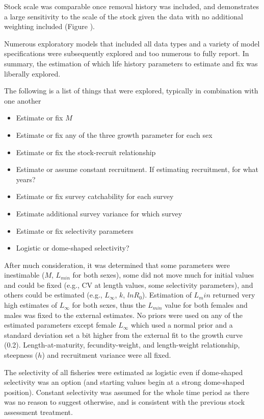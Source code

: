 \documentclass[
]{scrartcl}
\providecommand{\tightlist}{%
  \setlength{\itemsep}{0pt}\setlength{\parskip}{0pt}}\usepackage{longtable,booktabs,array}
\begin{document}
Stock scale was comparable once removal history was included, and
demonstrates a large sensitivity to the scale of the stock given the
data with no additional weighting included (Figure ).

Numerous exploratory models that included all data types and a variety
of model specifications were subsequently explored and too numerous to
fully report. In summary, the estimation of which life history
parameters to estimate and fix was liberally explored.

The following is a list of things that were explored, typically in
combination with one another

\begin{itemize}
\tightlist
\item
  Estimate or fix \(M\)
\item
  Estimate or fix any of the three growth parameter for each sex
\item
  Estimate or fix the stock-recruit relationship
\item
  Estimate or assume constant recruitment. If estimating recruitment,
  for what years?
\item
  Estimate or fix survey catchability for each survey
\item
  Estimate additional survey variance for which survey
\item
  Estimate or fix selectivity parameters
\item
  Logistic or dome-shaped selectivity?
\end{itemize}

After much consideration, it was determined that some parameters were
inestimable (\(M\), \(L_{min}\) for both sexes), some did not move much
for initial values and could be fixed (e.g., CV at length values, some
selectivity parameters), and others could be estimated (e.g.,
\(L_{\infty}\), \(k\), \(lnR_0\)). Estimation of \(L_min\) returned very
high estimates of \(L_{\infty}\) for both sexes, thus the \(L_{min}\)
value for both females and males was fixed to the external estimates. No
priors were used on any of the estimated parameters except female
\(L_{\infty}\) which used a normal prior and a standard deviation set a
bit higher from the external fit to the growth curve (0.2).
Length-at-maturity, fecundity-weight, and length-weight relationship,
steepness (\(h\)) and recruitment variance were all fixed.

The selectivity of all fisheries were estimated as logistic even if
dome-shaped selectivity was an option (and starting values begin at a
strong dome-shaped position). Constant selectivity was assumed for the
whole time period as there was no reason to suggest otherwise, and is
consistent with the previous stock assessment treatment.
\end{document}
